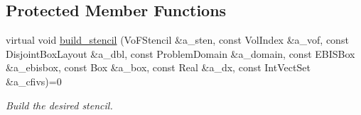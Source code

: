 \subsection*{Protected Member Functions}
\begin{DoxyCompactItemize}
\item 
virtual void \hyperlink{classirreg__stencil_a4ca524c5ea9958ae7980eecfc09f2732}{build\+\_\+stencil} (Vo\+F\+Stencil \&a\+\_\+sten, const Vol\+Index \&a\+\_\+vof, const Disjoint\+Box\+Layout \&a\+\_\+dbl, const Problem\+Domain \&a\+\_\+domain, const E\+B\+I\+S\+Box \&a\+\_\+ebisbox, const Box \&a\+\_\+box, const Real \&a\+\_\+dx, const Int\+Vect\+Set \&a\+\_\+cfivs)=0
\begin{DoxyCompactList}\small\item\em Build the desired stencil. \end{DoxyCompactList}\end{DoxyCompactItemize}
